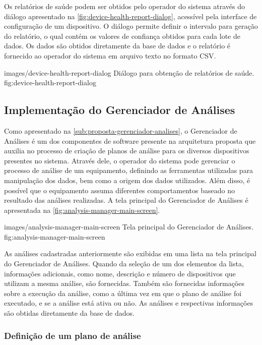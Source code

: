 Os relatórios de saúde podem ser obtidos pelo operador do sistema através do diálogo apresentado na
\cref{fig:device-health-report-dialog}, acessível pela interface de configuração de um dispositivo.
O diálogo permite definir o intervalo para geração do relatório, o qual contém os valores de
confiança obtidos para cada lote de dados. Os dados são obtidos diretamente da base de dados e o
relatório é fornecido ao operador do sistema em arquivo texto no formato \gls{CSV}.

  {images/device-health-report-dialog}
  {Diálogo para obtenção de relatórios de saúde.}
  {fig:device-health-report-dialog}


\subsection{Implementação do Gerenciador de Análises}

Como apresentado na \cref{sub:proposta-gerenciador-analises}, o Gerenciador de Análises é um dos
componentes de software presente na arquitetura proposta que auxilia no processo de criação de
planos de análise para os diversos dispositivos presentes no sistema. Através dele, o operador do
sistema pode gerenciar o processo de análise de um equipamento, definindo as ferramentas utilizadas
para manipulação dos dados, bem como a origem dos dados utilizados. Além disso, é possível que o
equipamento assuma diferentes comportamentos baseado no resultado das análises realizadas. A tela
principal do Gerenciador de Análises é apresentada na \cref{fig:analysis-manager-main-screen}.

  {images/analysis-manager-main-screen}
  {Tela principal do Gerenciador de Análises.}
  {fig:analysis-manager-main-screen}

As análises cadastradas anteriormente são exibidas em uma lista na tela principal do Gerenciador de
Análises. Quando da seleção de um dos elementos da lista, informações adicionais, como nome,
descrição e número de dispositivos que utilizam a mesma análise, são fornecidas. Também são
fornecidas informações sobre a execução da análise, como a última vez em que o plano de análise foi
executado, e se a análise está ativa ou não. As análises e respectivas informações são obtidas
diretamente da base de dados.


\subsubsection{Definição de um plano de análise}

